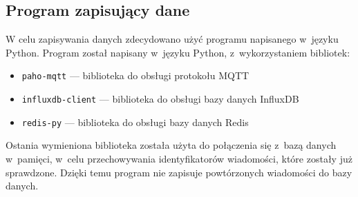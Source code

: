\subsection{Program zapisujący dane}
W celu zapisywania danych zdecydowano użyć programu napisanego w~języku Python.
Program został napisany w~języku Python, z~wykorzystaniem bibliotek:
\begin{itemize}
    \item \texttt{paho-mqtt} — biblioteka do obsługi protokołu MQTT~\cite{py:paho-mqtt}
    \item \texttt{influxdb-client} — biblioteka do obsługi bazy danych InfluxDB~\cite{py:influxdb}
    \item \texttt{redis-py} — biblioteka do obsługi bazy danych Redis~\cite{py:redis}
\end{itemize}
Ostania wymieniona biblioteka została użyta do połączenia się z~bazą danych w~pamięci, w~celu przechowywania identyfikatorów wiadomości, które zostały już sprawdzone.
Dzięki temu program nie zapisuje powtórzonych wiadomości do bazy danych.
